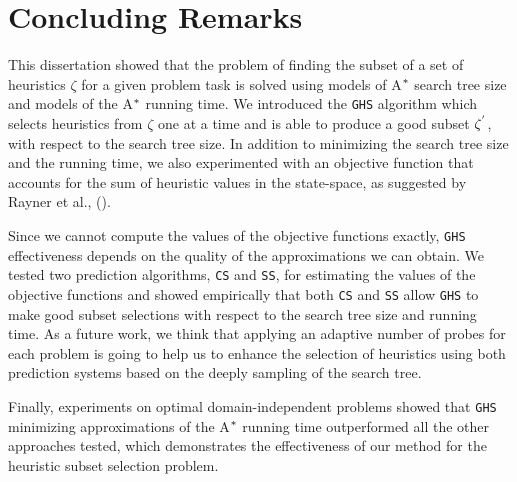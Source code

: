 
 
\chapter{Concluding Remarks}\label{ch:conclusions}

\noindent
This dissertation showed that the problem of finding the subset of a set of heuristics $\zeta$ for a given problem task is solved using models of A$\sp{*}$ search tree size and models of the A$\sp{*}$ running time. We introduced the \texttt{GHS} algorithm which selects heuristics from $\zeta$ one at a time and is able to produce a good subset $\zeta\sp{'}$, with respect to the search tree size. In addition to minimizing the search tree size and the running time, we also experimented with an objective function that accounts for the sum of heuristic values in the state-space, as suggested by Rayner et al., (\citeyear{raynersss13}).

Since we cannot compute the values of the objective functions exactly, \texttt{GHS} effectiveness depends on the quality of the approximations we can obtain. We tested two prediction algorithms, \texttt{CS} and \texttt{SS}, for estimating the values of the objective functions and showed empirically that both \texttt{CS} and \texttt{SS} allow \texttt{GHS} to make good subset selections with respect to the search tree size and running time. As a future work, we think that applying an adaptive number of probes for each problem is going to help us to enhance the selection of heuristics using both prediction systems based on the deeply sampling of the search tree.

Finally, experiments on optimal domain-independent problems showed that \texttt{GHS} minimizing approximations of the A$\sp{*}$ running time outperformed all the other approaches tested, which demonstrates the effectiveness of our method for the heuristic subset selection problem.

